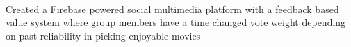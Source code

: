 \documentclass[letterpaper, article]{deedy-resume-openfont}
\begin{document}
\begin{minipage}[t]{0.66\textwidth}
\\
\begin{tightemize}
	\item Created a Firebase powered social multimedia platform with a feedback based value system where group members have a time changed vote weight depending on past reliability in picking enjoyable movies
\end{tightemize}



%
%


\end{minipage}
\end{document}
